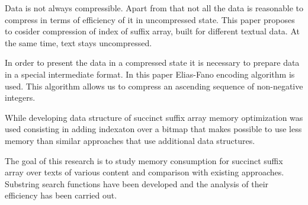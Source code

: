 Data is not always compressible. Apart from that not all the data is reasonable to compress
in terms of efficiency of it in uncompressed state.
This paper proposes to cosider compression of index of suffix array,
built for different textual data. At the same time, text stays uncompressed.

In order to present the data in a compressed state it is necessary to prepare
data in a special intermediate format.
In this paper Elias-Fano encoding algorithm \cite{pibiri2014dynamic} is used.
This algorithm allows us to compress an ascending sequence of non-negative integers.

While developing data structure of succinct suffix array memory optimization was used consisting in adding indexaton
over a bitmap that makes possible to use less memory than similar approaches that use additional data structures.

The goal of this research is to study memory consumption for succinct suffix array over texts of various content
and comparison with existing approaches.
Substring search functions have been developed and the analysis of their efficiency has been carried out.
